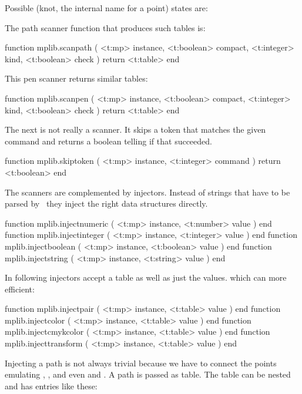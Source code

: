 Possible (knot, the internal name for a point) states are:

\startfourrows
{}
\stopfourrows

The path scanner function that produces such tables is:

\starttyping[option=LUA]
function mplib.scanpath (
    <t:mp>      instance,
    <t:boolean> compact,
    <t:integer> kind,
    <t:boolean> check
)
    return <t:table>
end
\stoptyping

This pen scanner returns similar tables:

\starttyping[option=LUA]
function mplib.scanpen (
    <t:mp>      instance,
    <t:boolean> compact,
    <t:integer> kind,
    <t:boolean> check
)
    return <t:table>
end
\stoptyping

The next is not really a scanner. It skips a token that matches the given command
and returns a boolean telling if that succeeded.

\starttyping[option=LUA]
function mplib.skiptoken ( <t:mp> instance, <t:integer> command )
    return <t:boolean>
end
\stoptyping

\stopsection

\startsection[title=Injectors]

The scanners are complemented by injectors. Instead of strings that have to be
parsed by \METAPOST\ they inject the right data structures directly.

\starttyping[option=LUA]
function mplib.injectnumeric ( <t:mp> instance, <t:number>  value ) end
function mplib.injectinteger ( <t:mp> instance, <t:integer> value ) end
function mplib.injectboolean ( <t:mp> instance, <t:boolean> value ) end
function mplib.injectstring  ( <t:mp> instance, <t:string>  value ) end
\stoptyping

In following injectors accept a table as well as just the values. which can more
efficient:

\starttyping[option=LUA]
function mplib.injectpair      ( <t:mp> instance, <t:table> value ) end
function mplib.injectcolor     ( <t:mp> instance, <t:table> value ) end
function mplib.injectcmykcolor ( <t:mp> instance, <t:table> value ) end
function mplib.injecttransform ( <t:mp> instance, <t:table> value ) end
\stoptyping

Injecting a path is not always trivial because we have to connect the points
emulating , , \type [option=MP]
{---} and even \type [option=MP] {&&} and . A path is
passed as table. The table can be nested and has entries like these:

